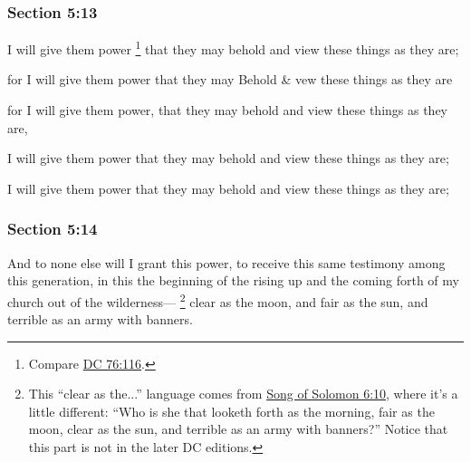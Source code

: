 	\subsubsection{Section 5:13} %
		\label{DC5-13}

		I will give them power%
			\footnote{%
				Compare \hyperref[DC76-116]{DC 76:116}.
				}
		that they may behold and view these things as they are;

		\begin{framed}
		\scriptsize
			\begin{compactdesc}
				\item[JSP] for I will give them power that they may Behold \& vew these things as they are
				\item[RB1] [\textit{missing}]
				\item[BC] for I will give them power, that they may behold and view these things as they are, 
				\item[DC 1835] I will give them power that they may behold and view these things as they are;
				\item[DC 1844] I will give them power that they may behold and view these things as they are;
			\end{compactdesc}
		\end{framed}

	\subsubsection{Section 5:14} %
		\label{DC5-14}

		And to none else will I grant this power, to receive this same testimony among this generation, in this the beginning of the rising up and the coming forth of my church out of the wilderness---%
			\footnote{%
				This ``clear as the...'' language comes from \hyperref[SONGOFSOLOMON-6-10]{Song of Solomon 6:10}, where it's a little different: ``Who is she that looketh forth as the morning, fair as the moon, clear as the sun, and terrible as an army with banners?'' Notice that this part is not in the later DC editions.
				}%
		clear as the moon, and fair as the sun, and terrible as an army with banners.

